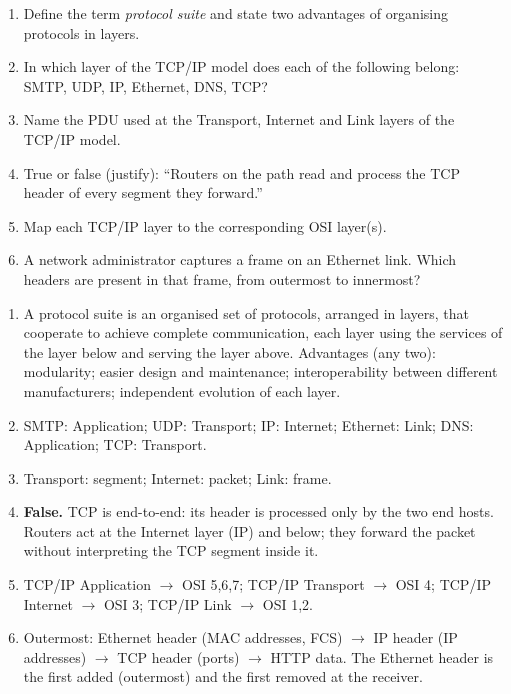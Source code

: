 \documentclass[11pt]{article}
\begin{document}
\begin{exercice}
\begin{enumerate}
\item Define the term \emph{protocol suite} and state two advantages of organising protocols in layers.
\item In which layer of the TCP/IP model does each of the following belong: SMTP, UDP, IP, Ethernet, DNS, TCP?
\item Name the PDU used at the Transport, Internet and Link layers of the TCP/IP model.
\item True or false (justify): ``Routers on the path read and process the TCP header of every segment they forward.''
\item Map each TCP/IP layer to the corresponding OSI layer(s).
\item A network administrator captures a frame on an Ethernet link. Which headers are present in that frame, from outermost to innermost?
\end{enumerate}
\end{exercice}

\begin{corrige}[Exercise 1]
\begin{enumerate}
\item A protocol suite is an organised set of protocols, arranged in layers, that cooperate to achieve complete communication, each layer using the services of the layer below and serving the layer above. Advantages (any two): modularity; easier design and maintenance; interoperability between different manufacturers; independent evolution of each layer.
\item SMTP: Application; UDP: Transport; IP: Internet; Ethernet: Link; DNS: Application; TCP: Transport.
\item Transport: segment; Internet: packet; Link: frame.
\item \textbf{False.} TCP is end-to-end: its header is processed only by the two end hosts. Routers act at the Internet layer (IP) and below; they forward the packet without interpreting the TCP segment inside it.
\item TCP/IP Application $\rightarrow$ OSI 5,6,7; TCP/IP Transport $\rightarrow$ OSI 4; TCP/IP Internet $\rightarrow$ OSI 3; TCP/IP Link $\rightarrow$ OSI 1,2.
\item Outermost: Ethernet header (MAC addresses, FCS) $\rightarrow$ IP header (IP addresses) $\rightarrow$ TCP header (ports) $\rightarrow$ HTTP data. The Ethernet header is the first added (outermost) and the first removed at the receiver.
\end{enumerate}
\end{corrige}
\end{document}
